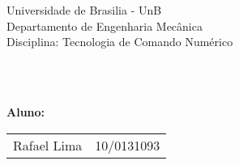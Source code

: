 \begin{flushleft}
Universidade de Brasilia - UnB\\
Departamento de Engenharia Mecânica\\
Disciplina: Tecnologia de Comando Numérico\\
\end{flushleft}

\vspace{0.3\textheight}
\begin{center}
    \Huge\textbf{\\\tituloRelatorio \\}
\end{center}

\vspace{\fill} %

\begin{flushleft}
\textbf{Aluno:}\\
\vspace{2mm}
\begin{tabular}{ll}
    Rafael Lima & 10/0131093
\end{tabular}
\end{flushleft}


\newpage

